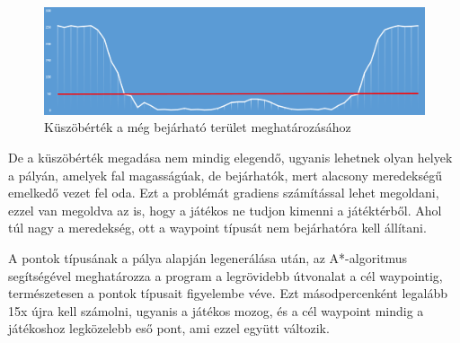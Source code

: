 \begin{figure}[h]
\centering
\includegraphics[scale=0.44]{kepek/magassagmezo_kuszobertek_diagram.png}
\caption{Küszöbérték a még bejárható terület meghatározásához}
\label{fig:kuszobertek}
\end{figure}


De a küszöbérték megadása nem mindig elegendő, ugyanis lehetnek olyan helyek a pályán, amelyek fal magasságúak, de bejárhatók, mert alacsony meredekségű emelkedő vezet fel oda. Ezt a problémát gradiens számítással lehet megoldani, ezzel van megoldva az is, hogy a játékos ne tudjon kimenni a játéktérből. Ahol túl nagy a meredekség, ott a waypoint típusát nem bejárhatóra kell állítani.

\newpage
A pontok típusának a pálya alapján legenerálása után, az A*-algoritmus segítségével meghatározza a program a legrövidebb útvonalat a cél waypointig, természetesen a pontok típusait figyelembe véve. Ezt másodpercenként legalább 15x újra kell számolni, ugyanis a játékos mozog, és a cél waypoint mindig a játékoshoz legközelebb eső pont, ami ezzel együtt változik.
